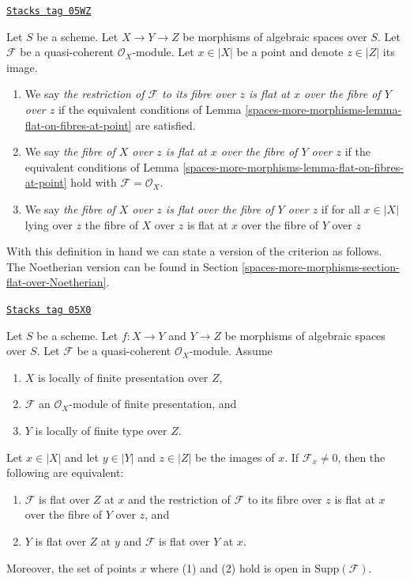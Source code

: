 \begin{definition}
\label{spaces-more-morphisms-definition-module-flat-on-fibre}
\href{https://stacks.math.columbia.edu/tag/05WZ}{\texttt{Stacks tag 05WZ}}

Let $S$ be a scheme. Let $X \to Y \to Z$ be morphisms of algebraic
spaces over $S$. Let $\mathcal{F}$ be a quasi-coherent $\mathcal{O}_X$-module.
Let $x \in |X|$ be a point and denote $z \in |Z|$ its image.
\begin{enumerate}
\item We say {\it the restriction of $\mathcal{F}$ to its fibre over $z$
is flat at $x$ over the fibre of $Y$ over $z$} if the equivalent conditions of
Lemma \ref{spaces-more-morphisms-lemma-flat-on-fibres-at-point}
are satisfied.
\item We say {\it the fibre of $X$ over $z$ is flat at $x$ over the fibre of
$Y$ over $z$} if the equivalent conditions of
Lemma \ref{spaces-more-morphisms-lemma-flat-on-fibres-at-point}
hold with $\mathcal{F} = \mathcal{O}_X$.
\item We say {\it the fibre of $X$ over $z$ is flat over the fibre of $Y$
over $z$} if for all $x \in |X|$ lying over $z$ the fibre of $X$ over $z$
is flat at $x$ over the fibre of $Y$ over $z$
\end{enumerate}
\end{definition}

With this definition in hand we can state a version of the criterion as
follows. The Noetherian version can be found in
Section \ref{spaces-more-morphisms-section-flat-over-Noetherian}.

\begin{theorem}
\label{spaces-more-morphisms-theorem-criterion-flatness-fibre}
\href{https://stacks.math.columbia.edu/tag/05X0}{\texttt{Stacks tag 05X0}}

Let $S$ be a scheme.
Let $f : X \to Y$ and $Y \to Z$ be morphisms of algebraic spaces over $S$.
Let $\mathcal{F}$ be a quasi-coherent $\mathcal{O}_X$-module.
Assume
\begin{enumerate}
\item $X$ is locally of finite presentation over $Z$,
\item $\mathcal{F}$ an $\mathcal{O}_X$-module of finite presentation, and
\item $Y$ is locally of finite type over $Z$.
\end{enumerate}
Let $x \in |X|$ and let $y \in |Y|$ and $z \in |Z|$ be the images of
$x$. If $\mathcal{F}_{\overline{x}} \not = 0$, then the following are
equivalent:
\begin{enumerate}
\item $\mathcal{F}$ is flat over $Z$ at $x$ and
the restriction of $\mathcal{F}$ to its fibre over $z$
is flat at $x$ over the fibre of $Y$ over $z$, and
\item $Y$ is flat over $Z$ at $y$ and $\mathcal{F}$ is
flat over $Y$ at $x$.
\end{enumerate}
Moreover, the set of points $x$ where (1) and (2) hold is open in
$\text{Supp}(\mathcal{F})$.
\end{theorem}

